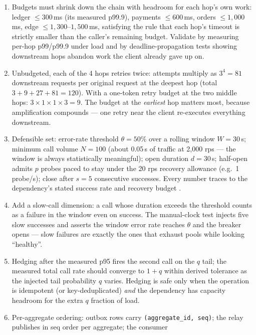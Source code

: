 \begin{enumerate}[leftmargin=2.2em]
  \item Budgets must shrink down the chain with headroom for each hop's own
    work: ledger $\le 300$\,ms (its measured p99.9), payments $\le 600$\,ms,
    orders $\le 1{,}000$\,ms, edge $\le 1{,}300$--$1{,}500$\,ms, satisfying
    the rule that each hop's timeout is strictly smaller than the caller's
    remaining budget. Validate by measuring per-hop p99/p99.9 under load
    and by deadline-propagation tests showing downstream hops abandon work
    the client already gave up on.
  \item Unbudgeted, each of the 4 hops retries twice: attempts multiply as
    $3^4 = 81$ downstream requests per original request at the deepest hop
    (total $3+9+27+81=120$). With a one-token retry budget at the two
    middle hops: $3 \times 1 \times 1 \times 3 = 9$. The budget at the
    \emph{earliest} hop matters most, because amplification compounds ---
    one retry near the client re-executes everything downstream.
  \item Defensible set: error-rate threshold $\theta = 50\%$ over a rolling
    window $W = 30$\,s; minimum call volume $N = 100$ (about 0.05\,s of
    traffic at 2{,}000 rps --- the window is always statistically
    meaningful); open duration $d = 30$\,s; half-open admits $p$ probes
    paced to stay under the 20 rps recovery allowance (e.g.\ 1 probe/s);
    close after $s = 5$ consecutive successes. Every number traces to the
    dependency's stated success rate and recovery budget
    \cite{nygard2018releaseit}.
  \item Add a slow-call dimension: a call whose duration exceeds the
    threshold counts as a failure in the window even on success. The
    manual-clock test injects five slow successes and asserts the window
    error rate reaches $\theta$ and the breaker opens --- slow failures are
    exactly the ones that exhaust pools while looking ``healthy''.
  \item Hedging after the measured p95 fires the second call on the $q$
    tail; the measured total call rate should converge to $1 + q$ within
    derived tolerance as the injected tail probability $q$ varies. Hedging
    is safe only when the operation is idempotent (or key-deduplicated)
    \emph{and} the dependency has capacity headroom for the extra $q$
    fraction of load.
  \item Per-aggregate ordering: outbox rows carry \texttt{(aggregate\_id,
    seq)}; the relay publishes in seq order per aggregate; the consumer

\end{enumerate}
